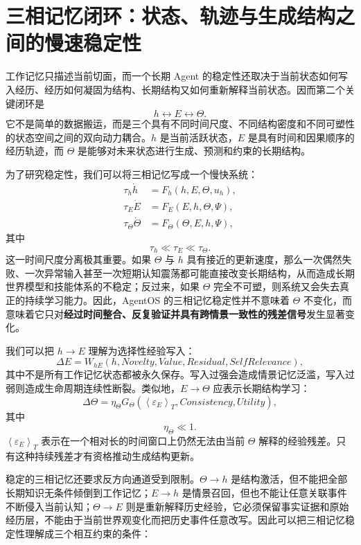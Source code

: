 \section{三相记忆闭环：状态、轨迹与生成结构之间的慢速稳定性}

工作记忆只描述当前切面，而一个长期 Agent 的稳定性还取决于当前状态如何写入经历、经历如何凝固为结构、长期结构又如何重新解释当前状态。因而第二个关键闭环是
\[
\boxed{
h
\leftrightarrow
E
\leftrightarrow
\Theta.
}
\]
它不是简单的数据搬运，而是三个具有不同时间尺度、不同结构密度和不同可塑性的状态空间之间的双向动力耦合。$h$ 是当前活跃状态，$E$ 是具有时间和因果顺序的经历轨迹，而 $\Theta$ 是能够对未来状态进行生成、预测和约束的长期结构。

为了研究稳定性，我们可以将三相记忆写成一个慢快系统：
\[
\begin{aligned}
\tau_h\dot h
&=
F_h(h,E,\Theta,u_h),\\
\tau_E\dot E
&=
F_E(E,h,\Theta,\Psi),\\
\tau_\Theta\dot\Theta
&=
F_\Theta(\Theta,E,h,\Psi),
\end{aligned}
\]
其中
\[
\tau_h\ll\tau_E\ll\tau_\Theta.
\]
这一时间尺度分离极其重要。如果 $\Theta$ 与 $h$ 具有接近的更新速度，那么一次偶然失败、一次异常输入甚至一次短期认知震荡都可能直接改变长期结构，从而造成长期世界模型和技能体系的不稳定；反过来，如果 $\Theta$ 完全不可塑，则系统又会失去真正的持续学习能力。因此，AgentOS 的三相记忆稳定性并不意味着 $\Theta$ 不变化，而意味着它只对\textbf{经过时间整合、反复验证并具有跨情景一致性的残差信号}发生显著变化。

我们可以把 $h\rightarrow E$ 理解为选择性经验写入：
\[
\Delta E
=
W_{hE}
\left(
h,
Novelty,
Value,
Residual,
SelfRelevance
\right),
\]
其中不是所有工作记忆状态都被永久保存。写入过强会造成情景记忆泛滥，写入过弱则造成生命周期连续性断裂。类似地，$E\rightarrow\Theta$ 应表示长期结构学习：
\[
\Delta\Theta
=
\eta_\Theta
G_\Theta
\left(
\left\langle
\varepsilon_E
\right\rangle_T,
Consistency,
Utility
\right),
\]
其中
\[
\eta_\Theta\ll1.
\]
$\left\langle\varepsilon_E\right\rangle_T$ 表示在一个相对长的时间窗口上仍然无法由当前 $\Theta$ 解释的经验残差。只有这种持续残差才有资格推动生成结构更新。

稳定的三相记忆还要求反方向通道受到限制。$\Theta\rightarrow h$ 是结构激活，但不能把全部长期知识无条件倾倒到工作记忆；$E\rightarrow h$ 是情景召回，但也不能让任意关联事件不断侵入当前认知；$\Theta\rightarrow E$ 则是重新解释历史经验，它必须保留事实证据和原始经历层，不能由于当前世界观变化而把历史事件任意改写。因此可以把三相记忆稳定性理解成三个相互约束的条件：
\begin{statementbox}
\centering
{}
\end{statementbox}

